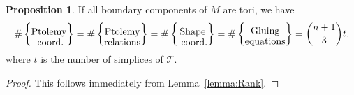 \documentclass[12pt]{amsart}
\theoremstyle{definition}
\newtheorem{proposition}[theorem]{Proposition}
\numberwithin{equation}{section}
\def\SL{\mathrm{SL}}
\def\PSL{\mathrm{PSL}}
\def\GL{\mathrm{GL}}
\def\C{\mathbb{C}}
\def\T{\mathcal{T}}
\begin{document}
\begin{proposition}\label{prop:DualityTori}
If all boundary components of $M$ are tori, we have
\begin{equation}
\#\left\{\txt{Ptolemy\\ ~coord.}\right\}=\#\left\{\txt{Ptolemy\\relations}\right\}=\#\left\{\txt{Shape\\ ~coord.}\right\} =\#\left\{\txt{Gluing\\equations}\right\}=\binom{n+1}{3}t,
\end{equation}
where $t$ is the number of simplices of $\T$.
\end{proposition}
\begin{proof}
This follows immediately from Lemma~\ref{lemma:Rank}.
\end{proof}



\end{document}
